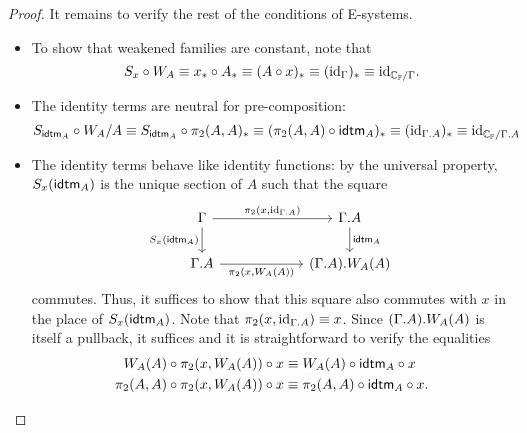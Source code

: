 \begin{proof}
It remains to verify the rest of the conditions of E-systems.
\begin{itemize}
\item To show that weakened families are constant, note that
\begin{equation*}
S_x\circ W_A\equiv x_\ast\circ A_\ast\equiv (A\circ x)_\ast\equiv ({\mathrm{id}_{\Gamma}})_\ast\equiv {\mathrm{id}_{\mathbb{C}_{\mathbb{F}}/\Gamma}}.
\end{equation*}
\item The identity terms are neutral for pre-composition:
\begin{equation*}
S_{\tfid{A}}\circ W_A/A \jdeq S_{\tfid{A}}\circ \pi_2(A,A)_\ast \jdeq (\pi_2(A,A)\circ\tfid{A})_\ast \jdeq
(\catid{\ctxext{\Gamma}{A}})_\ast \jdeq \catid{\cat{C}_{\cat{F}}/\ctxext{\Gamma}{A}} 
\end{equation*}
\item The identity terms behave like identity functions: by the universal property,
$S_x(\tfid{A})$ is the unique section of $A$ such that the square
\begin{equation*}
\begin{tikzcd}[column sep=6em]
\Gamma \arrow[d,swap,"{S_x(\tfid{A})}"] \arrow[r,"{\pi_2(x,\catid{\ctxext{\Gamma}{A}})}"] & \ctxext{\Gamma}{A} \arrow[d,"{\tfid{A}}"] \\
\ctxext{\Gamma}{A} \arrow[r,swap,"{\pi_2(x,W_A(A))}"] & \ctxext{{\Gamma}{A}}{W_A(A)}
\end{tikzcd}
\end{equation*}
commutes. Thus, it suffices to show that this square also commutes with $x$ in the place of
$S_x(\tfid{A})$. Note that $\pi_2(x,\catid{\ctxext{\Gamma}{A}})\jdeq x$. 
Since $\ctxext{{\Gamma}{A}}{W_A(A)}$ is itself a pullback, it suffices
and it is straightforward to verify the equalities
\begin{align*}
W_A(A)\circ\pi_2(x,W_A(A))\circ x & \jdeq W_A(A)\circ\idtm{A}\circ x \\
\pi_2(A,A)\circ\pi_2(x,W_A(A))\circ x & \jdeq \pi_2(A,A)\circ\idtm{A}\circ x.\qedhere
\end{align*}
\end{itemize}
\end{proof}



\begin{comment}
We then demonstrate how to define a category internal to an E-system. The main
point of this lies mainly in demonstrating how the operations of E-systems can
be used to define a category, because it is no surprise that a category can be
defined in type theory. Nevertheless, it is noteworthy that we need no further 
conditions on E-systems.
This is unlike the situation in category theory, where we need
to assume that the ambient category has finite limits in order to say what an
internal category is. In fact, it is possible to define an E-system internal
to an E-system, just using the algebraic structure of an E-system, and actually
defining an internal category was the hardest part of that definition.
\end{comment}

